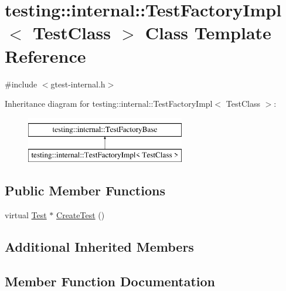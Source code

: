 \hypertarget{classtesting_1_1internal_1_1TestFactoryImpl}{}\section{testing\+::internal\+::Test\+Factory\+Impl$<$ Test\+Class $>$ Class Template Reference}
\label{classtesting_1_1internal_1_1TestFactoryImpl}


{\ttfamily \#include $<$gtest-\/internal.\+h$>$}

Inheritance diagram for testing\+::internal\+::Test\+Factory\+Impl$<$ Test\+Class $>$\+:\begin{figure}[H]
\begin{center}
\leavevmode
\includegraphics[height=2.000000cm]{classtesting_1_1internal_1_1TestFactoryImpl}
\end{center}
\end{figure}
\subsection*{Public Member Functions}
\begin{DoxyCompactItemize}
\item 
virtual \mbox{\hyperlink{classtesting_1_1Test}{Test}} $\ast$ \mbox{\hyperlink{classtesting_1_1internal_1_1TestFactoryImpl_a8860c89bdb06450a5d5e8137ebd9d775}{Create\+Test}} ()
\end{DoxyCompactItemize}
\subsection*{Additional Inherited Members}


\subsection{Member Function Documentation}
\mbox{\label{classtesting_1_1internal_1_1TestFactoryImpl_a8860c89bdb06450a5d5e8137ebd9d775}} 

